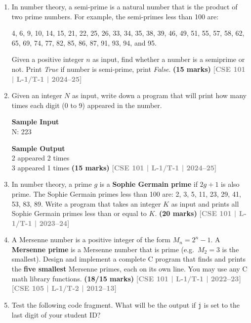 \documentclass[12pt,a3paper]{article}
\newcommand{\yr}[1]{\hfill\textcolor{gray}{\small\textbf{[#1]}}}
\newcommand{\mk}[1]{\textcolor{orange!70!black}{\small\textbf{(#1 marks)}}}
\begin{document}
\begin{enumerate}

  \item In number theory, a semi-prime is a natural number that is the product of two prime numbers. For example, the semi-primes less than 100 are:
    
    4, 6, 9, 10, 14, 15, 21, 22, 25, 26, 33, 34, 35, 38, 39, 46, 49, 51, 55, 57, 58, 62, 65, 69, 74, 77, 82, 85, 86, 87, 91, 93, 94, and 95.
    
    Given a positive integer $n$ as input, find whether a number is a semiprime or not. Print \textit{True} if number is semi-prime, print \textit{False}.
\mk{15} \yr{CSE 101 | L-1/T-1 | 2024--25}


  \item Given an integer $N$ as input, write down a program that will print how many times each digit (0 to 9) appeared in the number.
    
    \vspace{0.4cm}
    \noindent \textbf{Sample Input} \\
    N: 223
    
    \vspace{0.2cm}
    \noindent \textbf{Sample Output} \\
    2 appeared 2 times \\
    3 appeared 1 times
\mk{15} \yr{CSE 101 | L-1/T-1 | 2024--25}


\item In number theory, a prime $g$ is a \textbf{Sophie Germain prime} if $2g+1$ is also prime. The Sophie Germain primes less than 100 are: 2, 3, 5, 11, 23, 29, 41, 53, 83, 89. Write a program that takes an integer $K$ as input and prints all Sophie Germain primes less than or equal to $K$.
\mk{20} \yr{CSE 101 | L-1/T-1 | 2023--24}

\item A Mersenne number is a positive integer of the form $M_n = 2^n - 1$. A \textbf{Mersenne prime} is a Mersenne number that is prime (e.g.\ $M_2 = 3$ is the smallest). Design and implement a complete C program that finds and prints the \textbf{five smallest} Mersenne primes, each on its own line. You may use any C math library functions.
\mk{18/15} \yr{CSE 101 | L-1/T-1 | 2022--23} \yr{CSE 105 | L-1/T-2 | 2012--13}


\item Test the following code fragment. What will be the output if \texttt{j} is set to the last digit of your student ID?
 

\end{enumerate}
\end{document}
